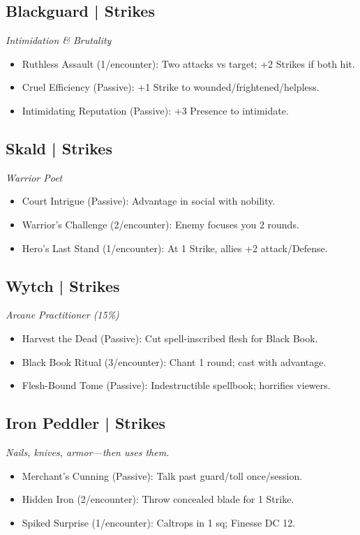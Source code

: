 \documentclass[10pt,twoside]{article}
\begin{document}
\begin{multicols}{2}
\subsection{Blackguard \;| Strikes}
\textit{Intimidation \& Brutality}
\begin{itemize}
\item Ruthless Assault (1/encounter): Two attacks vs target; +2 Strikes if both hit.
\item Cruel Efficiency (Passive): +1 Strike to wounded/frightened/helpless.
\item Intimidating Reputation (Passive): +3 Presence to intimidate.
\end{itemize}

\subsection{Skald \;| Strikes}
\textit{Warrior Poet}
\begin{itemize}
\item Court Intrigue (Passive): Advantage in social with nobility.
\item Warrior's Challenge (2/encounter): Enemy focuses you 2 rounds.
\item Hero's Last Stand (1/encounter): At 1 Strike, allies +2 attack/Defense.
\end{itemize}

\subsection{Wytch \;| Strikes}
\textit{Arcane Practitioner (15\%)}
\begin{itemize}
\item Harvest the Dead (Passive): Cut spell-inscribed flesh for Black Book.
\item Black Book Ritual (3/encounter): Chant 1 round; cast with advantage.
\item Flesh-Bound Tome (Passive): Indestructible spellbook; horrifies viewers.
\end{itemize}

\subsection{Iron Peddler \;| Strikes}
\textit{Nails, knives, armor—then uses them.}
\begin{itemize}
\item Merchant's Cunning (Passive): Talk past guard/toll once/session.
\item Hidden Iron (2/encounter): Throw concealed blade for 1 Strike.
\item Spiked Surprise (1/encounter): Caltrops in 1 sq; Finesse DC 12.
\end{itemize}


\end{multicols}
\end{document}
